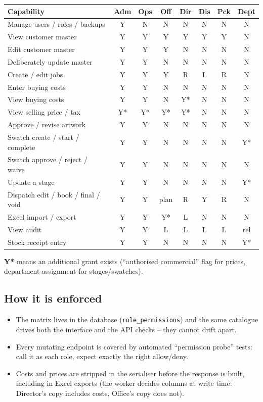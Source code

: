 \begin{center}
\footnotesize
\begin{tabular}{@{}l c c c c c c c@{}}
\toprule
\textbf{Capability} & \textbf{Adm} & \textbf{Ops} & \textbf{Off} & \textbf{Dir} &
\textbf{Dis} & \textbf{Pck} & \textbf{Dept} \\
\midrule
Manage users / roles / backups & Y & N & N & N & N & N & N \\
View customer master & Y & Y & Y & Y & Y & Y & N \\
Edit customer master & Y & Y & Y & N & N & N & N \\
Deliberately update master & Y & Y & N & N & N & N & N \\
Create / edit jobs & Y & Y & Y & R & L & R & N \\
Enter buying costs & Y & Y & N & N & N & N & N \\
View buying costs & Y & Y & N & Y* & N & N & N \\
View selling price / tax & Y* & Y* & Y* & Y* & N & N & N \\
Approve / revise artwork & Y & Y & N & N & N & N & N \\
Swatch create / start / complete & Y & Y & N & N & N & N & Y* \\
Swatch approve / reject / waive & Y & Y & N & N & N & N & N \\
Update a stage & Y & Y & N & N & N & N & Y* \\
Dispatch edit / book / final / void & Y & Y & plan & R & Y & R & N \\
Excel import / export & Y & Y & Y* & L & N & N & N \\
View audit & Y & Y & L & L & L & L & rel \\
Stock receipt entry & Y & Y & N & N & N & N & Y* \\
\bottomrule
\end{tabular}
\end{center}

\textbf{Y*} means an additional grant exists (``authorised commercial'' flag for prices,
department assignment for stages/swatches).

\subsection*{How it is enforced}

\begin{itemize}
  \item The matrix lives in the database (\texttt{role\_permissions}) and the same
        catalogue drives both the interface and the API checks -- they cannot drift apart.
  \item Every mutating endpoint is covered by automated ``permission probe'' tests: call
        it as each role, expect exactly the right allow/deny.
  \item Costs and prices are stripped in the serialiser before the response is built,
        including in Excel exports (the worker decides columns at write time: Director's
        copy includes costs, Office's copy does not).
\end{itemize}
